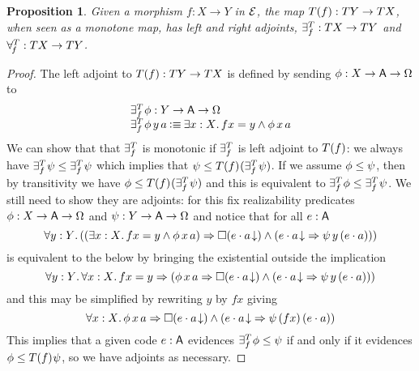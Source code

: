 \documentclass[11pt]{article}
\newtheorem{prop}[thrm]{Proposition}
\begin{document}
\begin{prop}\label{prop:trip-quantifiers}
  Given a morphism \(f : X \to Y\) in \(\mathcal{E}\), the map
  \(T{(}{f}) : T{Y} \to T{X}\), when seen as a monotone map, has left
  and right adjoints, \(\exists^{T}_{f} : T{X} \to T{Y}\) and
  \(\forall^{T}_{\!{f}} : T{X} \to T{Y}\).
\end{prop}
\begin{proof}
  The left adjoint to \(T{(}{f}) : T{Y} \to T{X}\) is defined by
  sending \(\phi : {{X}\to{{{\ensuremath{\mathsf{A}}}\to{\Omega}}}}\) to
  \[
    \begin{array}{l}
      \exists^{T}_{f}\mspace{1mu}{\phi} : {{Y}\to{{{\ensuremath{\mathsf{A}}}\to{\Omega}}}}\\
      {\exists^{T}_{f}\mspace{1mu}{\phi}\,y\,a} \mathbin{\vcentcolon\equiv} {\exists{x:X}.\,{{fx=y}\land{\phi\,x\,a}}}
    \end{array}
  \]
  We can show that that \(\exists^{T}_{f}\) is monotonic if \(\exists^{T}_{f}\) is
  left adjoint to \(T{(}{f})\): we always have
  \({\exists^{T}_{f}\mspace{1mu}{\psi}}\leq{\exists^{T}_{f}\mspace{1mu}{\psi}}\) which implies that
  \({\psi}\leq{T{(}{f})\mspace{1mu}{(\exists^{T}_{f}\mspace{1mu}{\psi})}}\).
  If we assume \({\phi}\leq{\psi}\), then by transitivity we have
  \({\phi}\leq{T{(}{f})\mspace{1mu}{(\exists^{T}_{f}\mspace{1mu}{\psi})}}\) and this is equivalent to
  \({\exists^{T}_{f}\mspace{1mu}{\phi}}\leq{\exists^{T}_{f}\mspace{1mu}{\psi}}\).
  We still need to show they are adjoints: for this fix realizability predicates
  \(\phi:{{X}\to{{{\ensuremath{\mathsf{A}}}\to{\Omega}}}}\) and \(\psi:{{Y}\to{{{\ensuremath{\mathsf{A}}}\to{\Omega}}}}\) and notice that for all
  \(e:\mathsf{A}\)
  \[
    \IForall%
    {y:Y}%
    {(\IImplies%
      {(\IExists{x:X}{\IAnd{fx=y}{\phi\,x\,a}})}%
      {\IAnd%
        {\IBox{(\ITotal{\IAp{e}{a}})}}%
        {(\IImplies%
          {\ITotal{\IAp{e}{a}}}%
          {\psi\,y\,(\IAp{e}{a})})%
        }})}
  \]
  is equivalent to the below by bringing the existential outside the implication
  \[
    \IForall%
    {y:Y}%
    {\IForall%
      {x:X}%
      {\IImplies%
        {fx=y}%
        {(\IImplies%
          {\phi\,x\,a}%
          {\IAnd%
            {\IBox{(\ITotal{\IAp{e}{a}})}}%
            {(\IImplies%
              {\ITotal{\IAp{e}{a}}}%
              {\psi\,y\,(\IAp{e}{a})})%
            }})}}}
  \]
  and this may be simplified by rewriting \(y\) by \(fx\) giving
  \[
    \IForall%
    {x:X}%
    {\IImplies%
      {\phi\,x\,a}%
      {\IAnd%
        {\IBox{(\ITotal{\IAp{e}{a}})}}%
        {(\IImplies%
          {\ITotal{\IAp{e}{a}}}%
          {\psi\,(fx)\,(\IAp{e}{a})})%
        }}}
  \]
  This implies that a given code \(e:\mathsf{A}\) evidences
  \({\exists^{T}_{f}\mspace{1mu}{\phi}}\leq{\psi}\) if and only if it evidences
  \({\phi}\leq{T{(}{f})\mspace{1mu}{\psi}}\),
  so we have adjoints as necessary.


\end{proof}
\end{document}
